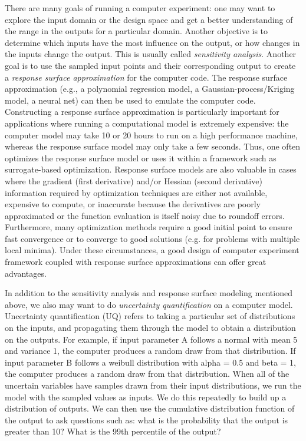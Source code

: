 There are many goals of running a computer experiment: one may want to 
explore the input domain or the design space and get a better understanding 
of the range in the outputs for a particular domain. Another objective is 
to determine which inputs have the most influence on the output, or how 
changes in the inputs change the output. This is usually called 
\emph{sensitivity analysis}. 
Another goal is to use the 
sampled input points and their corresponding output to create a 
\emph{response surface approximation} for the computer code. The response 
surface approximation (e.g., a polynomial regression model, a 
Gaussian-process/Kriging model, a neural net) can then be used to emulate 
the computer code. 
Constructing a response surface approximation is particularly important 
for applications where running a computational model is extremely expensive:  
the computer model may take 10 or 20 hours to run on a high performance 
machine, whereas the response surface model may only take a few seconds. 
Thus, one often optimizes the response surface model or uses it within a 
framework such as surrogate-based optimization. Response surface models 
are also valuable in cases where the gradient (first derivative) and/or 
Hessian (second derivative) information required by optimization techniques 
are either not available, expensive to compute, or inaccurate because the 
derivatives are poorly approximated or the function evaluation is itself 
noisy due to roundoff errors. Furthermore, many optimization methods 
require a good initial point to ensure fast convergence or to converge to 
good solutions (e.g. for problems with multiple local minima). Under these 
circumstances, a good design of computer experiment framework coupled with 
response surface approximations can offer great advantages. 

In addition to the sensitivity analysis and response 
surface modeling mentioned above, we also may want to do 
\emph{uncertainty quantification} on a computer model. 
Uncertainty quantification (UQ) refers to taking a particular set of 
distributions on the inputs, and propagating them through the model to 
obtain a distribution on the outputs. For example, if input parameter A 
follows a normal with mean 5 and variance 1, the computer produces a random 
draw from that distribution. If input parameter B follows a weibull 
distribution with alpha = 0.5 and beta = 1, the computer produces a random 
draw from that distribution. When all of the uncertain variables have 
samples drawn from their input distributions, we run the model with the 
sampled values as inputs. We do this repeatedly to build up a distribution 
of outputs. We can then use the cumulative distribution function of the 
output to ask questions such as:  what is the probability that the output is 
greater than 10?   What is the 99th percentile of the output?  

